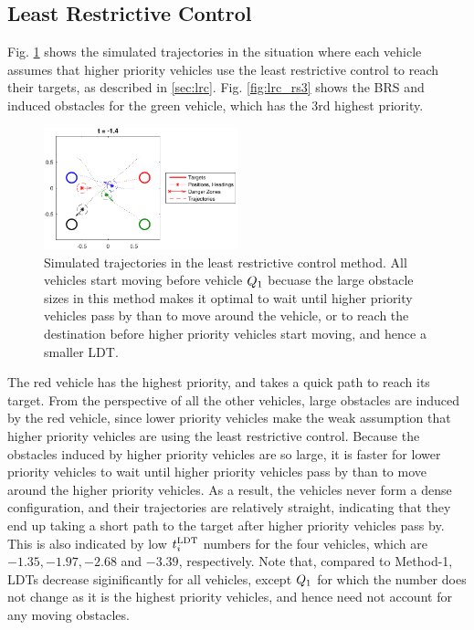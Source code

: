 \subsection{Least Restrictive Control}
Fig. \ref{fig:lrc_traj} shows the simulated trajectories in the situation where each vehicle assumes that higher priority vehicles use the least restrictive control to reach their targets, as described in \ref{sec:lrc}. Fig. \ref{fig:lrc_rs3} shows the BRS and induced obstacles for the green vehicle, which has the 3rd highest priority.

\begin{figure}
  \centering
  \includegraphics[width=0.5\textwidth]{"fig/lrc_traj"}
  \caption{Simulated trajectories in the least restrictive control method. All vehicles start moving before vehicle $Q_1$ becuase the large obstacle sizes in this method makes it optimal to wait until higher priority vehicles pass by than to move around the vehicle, or to reach the destination before higher priority vehicles start moving, and hence a smaller LDT. }
  \label{fig:lrc_traj}
\end{figure}

The red vehicle has the highest priority, and takes a quick path to reach its target. From the perspective of all the other vehicles, large obstacles are induced by the red vehicle, since lower priority vehicles make the weak assumption that higher priority vehicles are using the least restrictive control. Because the obstacles induced by higher priority vehicles are so large, it is faster for lower priority vehicles to wait until higher priority vehicles pass by than to move around the higher priority vehicles. As a result, the vehicles never form a dense configuration, and their trajectories are relatively straight, indicating that they end up taking a short path to the target after higher priority vehicles pass by. This is also indicated by low $t^\text{LDT}_i$ numbers for the four vehicles, which are $-1.35, -1.97, -2.68$ and $-3.39$, respectively. Note that, compared to Method-1, LDTs decrease siginificantly for all vehicles, except $Q_1$ for which the number does not change as it is the highest priority vehicles, and hence need not account for any moving obstacles. 

